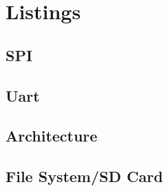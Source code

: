 \documentclass[12pt,a4paper,titlepage,oneside]{article}
\begin{document}
\section{Listings}
\small{

\subsection{SPI}




\subsection{Uart}








\subsection{Architecture}















\subsection{File System/SD Card}

}
\end{document}
